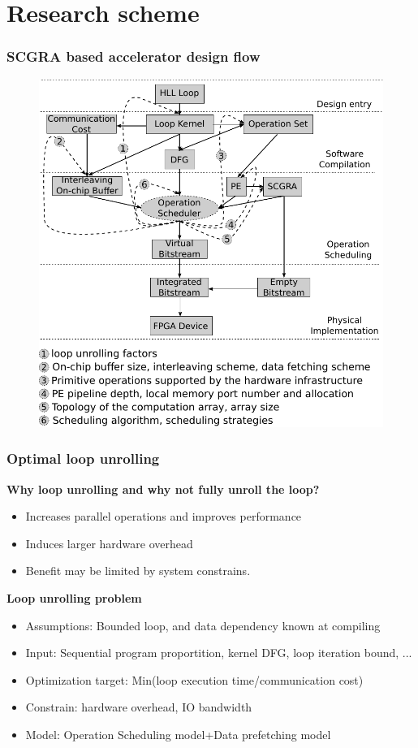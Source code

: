 \documentclass{beamer}
\begin{document}
\section{Research scheme}
\begin{frame}[t]
\frametitle{SCGRA based accelerator design flow}

\begin{figure}
\vspace{-1em}
\includegraphics[width=0.76\linewidth]{design-space-overview2}
\end{figure}

\end{frame}

\begin{frame}[t]
\frametitle{Optimal loop unrolling}

\vspace{-1em}
\textbf{Why loop unrolling and why not fully unroll the loop?}
\begin{itemize}
\item Increases parallel operations and improves performance
\item Induces larger hardware overhead
\item Benefit may be limited by system constrains.
\end{itemize}

\textbf{Loop unrolling problem}
\begin{itemize}
\item Assumptions: Bounded loop, and data dependency known at compiling
\item Input: Sequential program proportition, kernel DFG, loop iteration bound, ...
\item Optimization target: Min(loop execution time/communication cost)
\item Constrain: hardware overhead, IO bandwidth 
\item Model: Operation Scheduling model+Data prefetching model
\end{itemize}
\end{frame}
\end{document}
